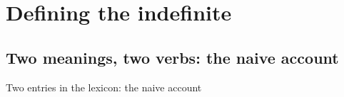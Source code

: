 

\section{Defining the indefinite} 


\subsection{Two meanings, two verbs: the naive account} 

Two entries in the lexicon: the naive account








